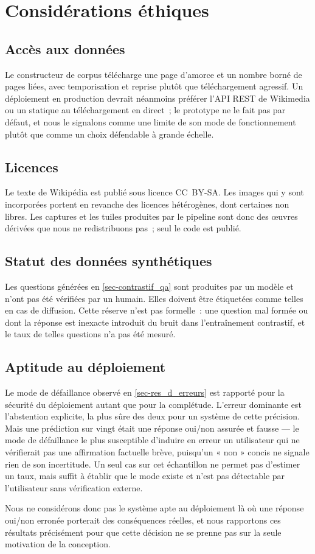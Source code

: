 \chapter{Considérations éthiques}
\label{annexe-ethique}

\section{Accès aux données}

Le constructeur de corpus télécharge une page d'amorce et un nombre borné de
pages liées, avec temporisation et reprise plutôt que téléchargement agressif. Un
déploiement en production devrait néanmoins préférer l'API REST de Wikimedia ou un
 statique au téléchargement en direct~; le prototype ne le fait pas
par défaut, et nous le signalons comme une limite de son mode de fonctionnement
plutôt que comme un choix défendable à grande échelle.

\section{Licences}

Le texte de Wikipédia est publié sous licence CC~BY-SA. Les images qui y sont
incorporées portent en revanche des licences hétérogènes, dont certaines non
libres. Les captures et les tuiles produites par le pipeline sont donc des œuvres
dérivées que nous ne redistribuons pas~; seul le code est publié.

\section{Statut des données synthétiques}

Les questions générées en \cref{sec-contrastif_qa} sont produites par un modèle et
n'ont pas été vérifiées par un humain. Elles doivent être étiquetées comme telles
en cas de diffusion. Cette réserve n'est pas formelle~: une question mal formée ou
dont la réponse est inexacte introduit du bruit dans l'entraînement contrastif, et
le taux de telles questions n'a pas été mesuré.

\section{Aptitude au déploiement}

Le mode de défaillance observé en \cref{sec-res_d_erreurs} est rapporté pour la
sécurité du déploiement autant que pour la complétude. L'erreur dominante est
l'abstention explicite, la plus sûre des deux pour un système de cette précision.
Mais une prédiction sur vingt était une réponse oui/non assurée et fausse
--- le mode de défaillance le plus susceptible d'induire en erreur un utilisateur
qui ne vérifierait pas une affirmation factuelle brève, puisqu'un « non » concis
ne signale rien de son incertitude. Un seul cas sur cet échantillon ne permet
pas d'estimer un taux, mais suffit à établir que le mode existe et n'est pas
détectable par l'utilisateur sans vérification externe.

Nous ne considérons donc pas le système apte au déploiement là où une réponse
oui/non erronée porterait des conséquences réelles, et nous rapportons ces
résultats précisément pour que cette décision ne se prenne pas sur la seule
motivation de la conception.
